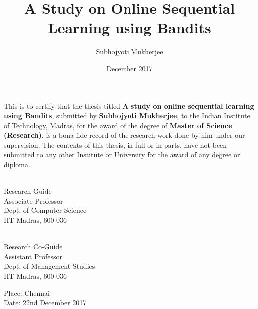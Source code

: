 \documentclass[MS]{iitmdiss}
\begin{document}

\title{A Study on Online Sequential Learning using Bandits}

\author{Subhojyoti Mukherjee}

\date{December 2017}

\maketitle

\certificate

\vspace*{0.5in}

\noindent This is to certify that the thesis titled {\bf A study on online sequential learning using Bandits}, submitted by {\bf Subhojyoti Mukherjee}, 
  to the Indian Institute of Technology, Madras, for
the award of the degree of {\bf Master of Science (Research)}, is a bona fide
record of the research work done by him under our supervision.  The
contents of this thesis, in full or in parts, have not been submitted
to any other Institute or University for the award of any degree or
diploma.

\vspace*{1.5in}

\begin{singlespacing}
\hspace*{-0.25in}
\parbox{2.5in}{
 \\
\noindent Research Guide \\ 
\noindent Associate Professor \\
\noindent Dept. of Computer Science\\
\noindent IIT-Madras, 600 036 \\
} 
\hspace*{1.0in} 
\parbox{2.5in}{
 \\
\noindent Research Co-Guide \\ 
\noindent Assistant Professor \\
\noindent Dept.  of  Management Studies\\
\noindent IIT-Madras, 600 036 \\
}  
\end{singlespacing}
\vspace*{0.25in}
\noindent Place: Chennai\\
Date: 22nd December 2017 
\end{document}
